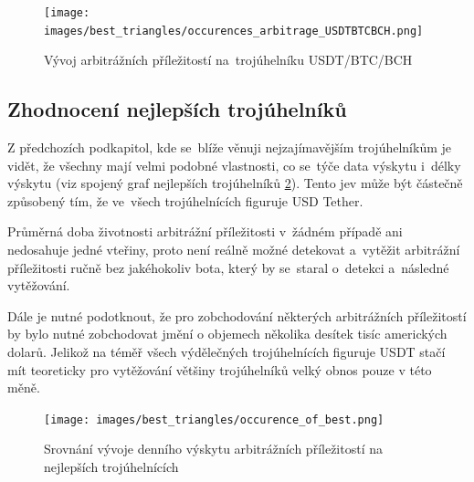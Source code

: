 \documentclass[thesis=B,czech]{FITthesis}[2019/03/21]
\begin{document}
\begin{figure}\centering
	\texttt{[image: images/best\_triangles/occurences\_arbitrage\_USDTBTCBCH.png]}
	\caption{Vývoj arbitrážních příležitostí na~trojúhelníku USDT/BTC/BCH }\label{occurences_arbitrage_USDTBTCBCH}
\end{figure}

\subsection{Zhodnocení nejlepších trojúhelníků}
Z předchozích podkapitol, kde se~blíže věnuji nejzajímavějším trojúhelníkům je vidět, že všechny mají velmi podobné vlastnosti, co se~týče data výskytu i~délky výskytu (viz spojený graf nejlepších trojúhelníků \ref{occurence_of_best}). Tento jev může být částečně způsobený tím, že ve~všech trojúhelnících figuruje USD Tether. 

Průměrná doba životnosti arbitrážní příležitosti v~žádném případě ani nedosahuje jedné vteřiny, proto není reálně možné detekovat a~vytěžit arbitrážní příležitosti ručně bez jakéhokoliv bota, který by se~staral o~detekci a~následné vytěžování. 

Dále je nutné podotknout, že pro zobchodování některých arbitrážních příležitostí by bylo nutné zobchodovat jmění o objemech několika desítek tisíc amerických dolarů. Jelikož na téměř všech výdělečných trojúhelnících figuruje USDT stačí mít teoreticky pro vytěžování většiny trojúhelníků velký obnos pouze v této měně.

\begin{figure}\centering
	\texttt{[image: images/best\_triangles/occurence\_of\_best.png]}
	\caption{Srovnání vývoje denního výskytu arbitrážních příležitostí na nejlepších trojúhelnících }\label{occurence_of_best}
\end{figure}
\end{document}
